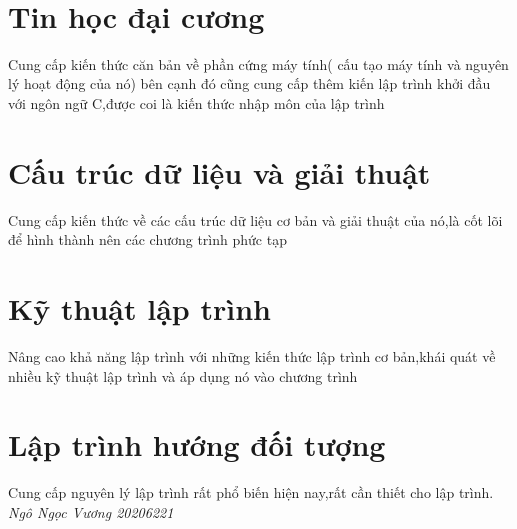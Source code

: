 \documentclass[10pt,a4paper,oneside]{article}
\author{June}
\begin{document}
	\
	
	\section{Tin học đại cương}
	Cung cấp kiến thức căn bản về phần cứng máy tính( cấu tạo máy tính và nguyên lý hoạt động của nó)
	bên cạnh đó cũng cung cấp thêm kiến lập trình khởi đầu với ngôn ngữ C,được coi là kiến thức nhập môn của lập trình

	
	\section{Cấu trúc dữ liệu và giải thuật}
	Cung cấp kiến thức về các cấu trúc dữ liệu cơ bản và giải thuật của nó,là cốt lõi để hình thành nên các chương trình phức tạp
	\section{Kỹ thuật lập trình}
	Nâng cao khả năng lập trình với những kiến thức lập trình cơ bản,khái quát về nhiều kỹ thuật lập trình và áp dụng nó vào chương trình
	\section{Lập trình hướng đối tượng}
	Cung cấp nguyên lý lập trình rất phổ biến hiện nay,rất cần thiết cho lập trình.
	\em \large Ngô Ngọc Vương 20206221
\end{document}
